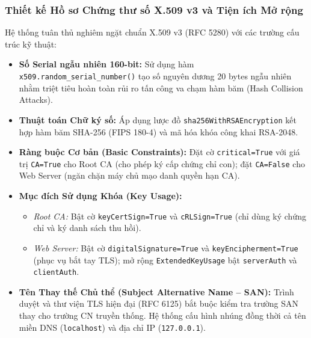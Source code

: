 \documentclass[a4paper,12pt]{article}
\begin{document}
\subsubsection{Thiết kế Hồ sơ Chứng thư số X.509 v3 và Tiện ích Mở rộng}
Hệ thống tuân thủ nghiêm ngặt chuẩn X.509 v3 (RFC 5280) với các trường cấu trúc kỹ thuật:
\begin{itemize}
    \item \textbf{Số Serial ngẫu nhiên 160-bit:} Sử dụng hàm \texttt{x509.random\_serial_number()} tạo số nguyên dương 20 bytes ngẫu nhiên nhằm triệt tiêu hoàn toàn rủi ro tấn công va chạm hàm băm (Hash Collision Attacks).
    \item \textbf{Thuật toán Chữ ký số:} Áp dụng lược đồ \texttt{sha256WithRSAEncryption} kết hợp hàm băm SHA-256 (FIPS 180-4) và mã hóa khóa công khai RSA-2048.
    \item \textbf{Ràng buộc Cơ bản (Basic Constraints):} Đặt cờ \texttt{critical=True} với giá trị \texttt{CA=True} cho Root CA (cho phép ký cấp chứng chỉ con); đặt \texttt{CA=False} cho Web Server (ngăn chặn máy chủ mạo danh quyền hạn CA).
    \item \textbf{Mục đích Sử dụng Khóa (Key Usage):}
    \begin{itemize}
        \item \textit{Root CA:} Bật cờ \texttt{keyCertSign=True} và \texttt{cRLSign=True} (chỉ dùng ký chứng chỉ và ký danh sách thu hồi).
        \item \textit{Web Server:} Bật cờ \texttt{digitalSignature=True} và \texttt{keyEncipherment=True} (phục vụ bắt tay TLS); mở rộng \texttt{ExtendedKeyUsage} bật \texttt{serverAuth} và \texttt{clientAuth}.
    \end{itemize}
    \item \textbf{Tên Thay thế Chủ thể (Subject Alternative Name -- SAN):} Trình duyệt và thư viện TLS hiện đại (RFC 6125) bắt buộc kiểm tra trường SAN thay cho trường CN truyền thống. Hệ thống cấu hình nhúng đồng thời cả tên miền DNS (\texttt{localhost}) và địa chỉ IP (\texttt{127.0.0.1}).
\end{itemize}
\end{document}
